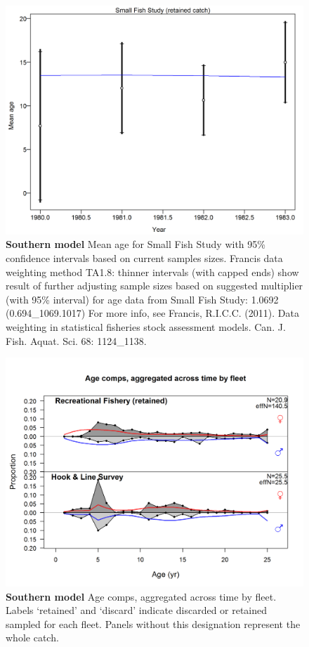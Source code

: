 \documentclass[12pt,]{article}
\begin{document}
\begin{figure}[htbp]
\centering
\includegraphics{./tex2pdf.8516/0e7dd18980df3aa7f97e67b9eecb6731719cd7b6.png}
\caption{\textbf{Southern model} Mean age for Small Fish Study with 95\%
confidence intervals based on current samples sizes. Francis data
weighting method TA1.8: thinner intervals (with capped ends) show result
of further adjusting sample sizes based on suggested multiplier (with
95\% interval) for age data from Small Fish Study: 1.0692
(0.694\_1069.1017) For more info, see Francis, R.I.C.C. (2011). Data
weighting in statistical fisheries stock assessment models. Can. J.
Fish. Aquat. Sci. 68: 1124\_1138.
\label{fig:mod2_8_comp_agefit_data_weighting_TA1.8_Small Fish Study}}
\end{figure}

\begin{figure}[htbp]
\centering
\includegraphics{./r4ss/plots_mod2/comp_agefit__aggregated_across_time.png}
\caption{\textbf{Southern model} Age comps, aggregated across time by
fleet. Labels `retained' and `discard' indicate discarded or retained
sampled for each fleet. Panels without this designation represent the
whole catch. \label{fig:mod2_9_comp_agefit__aggregated_across_time}}
\end{figure}
\end{document}
